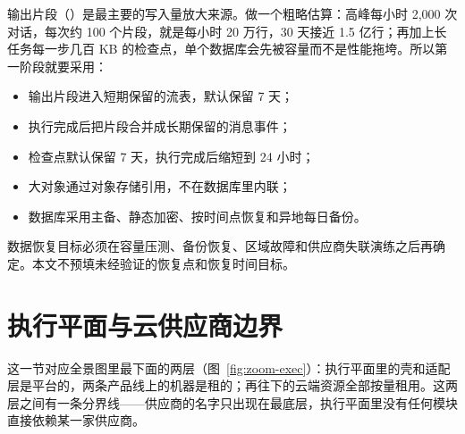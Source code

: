 输出片段（）是最主要的写入量放大来源。做一个粗略估算：高峰每小时 2,000 次对话，每次约 100 个片段，就是每小时 20 万行，30 天接近 1.5 亿行；再加上长任务每一步几百 KB 的检查点，单个数据库会先被容量而不是性能拖垮。所以第一阶段就要采用：

\begin{itemize}
  \item 输出片段进入短期保留的流表，默认保留 7 天；
  \item 执行完成后把片段合并成长期保留的消息事件；
  \item 检查点默认保留 7 天，执行完成后缩短到 24 小时；
  \item 大对象通过对象存储引用，不在数据库里内联；
  \item 数据库采用主备、静态加密、按时间点恢复和异地每日备份。
\end{itemize}

数据恢复目标必须在容量压测、备份恢复、区域故障和供应商失联演练之后再确定。本文不预填未经验证的恢复点和恢复时间目标。

\section{执行平面与云供应商边界}
\label{sec:execplane}

这一节对应全景图里最下面的两层（图~\ref{fig:zoom-exec}）：执行平面里的壳和适配层是平台的，两条产品线上的机器是租的；再往下的云端资源全部按量租用。这两层之间有一条分界线——供应商的名字只出现在最底层，执行平面里没有任何模块直接依赖某一家供应商。

